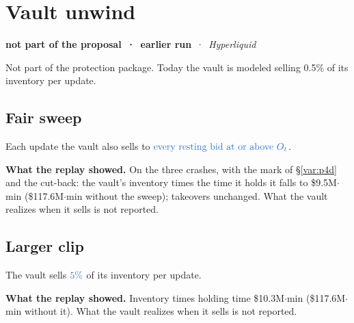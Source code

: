 \documentclass[10.5pt,a4paper]{article}
\newcommand{\chg}[1]{\ensuremath{{\color[HTML]{2F74D0}#1}}}
\newcommand{\st}[3]{\textcolor{#1}{\textbf{#2}} \,·\, \emph{#3}\par}
\newcommand{\res}[1]{\par\textbf{What the replay showed.} #1\par}
\begin{document}
\section{Vault unwind}\label{sec:vault}
\st{sup}{not part of the proposal \,·\, earlier run}{Hyperliquid}
Not part of the protection package. Today the vault is modeled selling 0.5\% of its inventory per update.

\subsection{Fair sweep}\label{var:sweep}
Each update the vault also sells to $\chg{\text{every resting bid at or above } O_t}$.
\res{On the three crashes, with the mark of \S\ref{var:p4d} and the cut-back: the vault's inventory times the time it holds it falls to \$9.5M$\cdot$min (\$117.6M$\cdot$min without the sweep); takeovers unchanged. What the vault realizes when it sells is not reported.}

\subsection{Larger clip}\label{var:clip}
The vault sells $\chg{5\%}$ of its inventory per update.
\res{Inventory times holding time \$10.3M$\cdot$min (\$117.6M$\cdot$min without it). What the vault realizes when it sells is not reported.}
\end{document}
